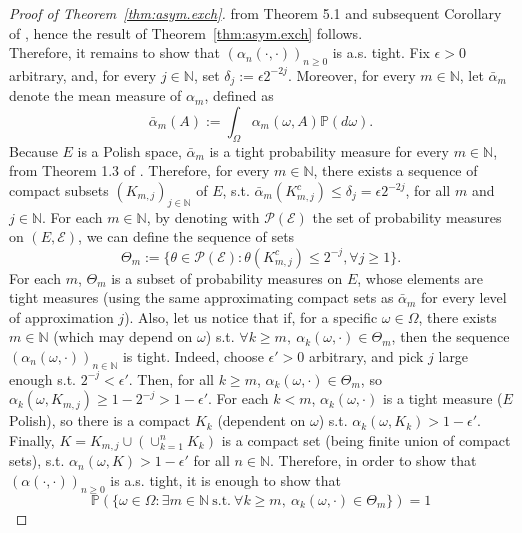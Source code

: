 \documentclass{article}
\theoremstyle{definition}
\renewcommand{\&}{and}
\begin{document}
\begin{proof}[Proof of Theorem~\ref{thm:asym.exch}]
from Theorem 5.1 and subsequent Corollary of \cite{bil99}, hence the result of Theorem~\ref{thm:asym.exch} follows. \vspace{0.2cm} \\
Therefore, it remains to show that $(\alpha_n(\cdot,\cdot))_{n\geq 0}$ is a.s. tight.    
Fix $\epsilon>0$ arbitrary, and, for every $j\in \mathbb{N}$, set $\delta_{j} := \epsilon 2^{-2j}$. Moreover, for every $m\in \mathbb{N}$, let $\bar{\alpha}_{m}$ denote the mean measure of $\alpha_{m}$, defined as 
$$\bar{\alpha}_{m}(A):= \int_{\Omega} \alpha_{m}(\omega,A) \mathbb{P}(d\omega).$$ Because $E$ is a Polish space, $\bar{\alpha}_{m}$ is a tight probability measure for every $m\in \mathbb{N}$, from Theorem 1.3 of \cite{bil99}. Therefore, for every $m\in \mathbb{N}$, there exists a sequence of compact subsets $(K_{m,j})_{j\in \mathbb{N}}$ of $E$, s.t. $\bar{\alpha}_{m}(K_{m,j}^{c})\leq \delta_{j}=\epsilon 2^{-2j}$, for all $m$ and $j\in \mathbb{N}$.  For each $m\in \mathbb{N}$, by denoting with $\mathcal{P}(\mathcal{E})$ the set of probability measures on $(E,\mathcal{E})$, we can define the sequence of sets
\begin{equation*}
    \Theta_{m}:=\{ \theta \in \mathcal{P}(\mathcal{E}) : \theta(K^{c}_{m,j} )\leq 2^{-j}, \forall j \geq 1\}.
\end{equation*}
For each $m$, $\Theta_{m}$ is a subset of probability measures on $E$, whose elements are tight measures (using the same approximating compact sets as $\bar{\alpha}_{m}$ for every level of approximation $j$). Also, let us notice that if, for a specific $\omega \in \Omega$,  there exists $m \in \mathbb{N}$ (which may depend on $\omega$) s.t. $\forall k\geq m, \ \alpha_{k}(\omega, \cdot) \in \Theta_{m}$, then the sequence $(\alpha_{n}(\omega, \cdot))_{n\in \mathbb{N}}$ is tight. Indeed, choose $\epsilon'>0$ arbitrary, and pick $j$ large enough s.t. $2^{-j}<\epsilon'$. Then, for all $k\geq m$, $\alpha_{k}(\omega, \cdot) \in \Theta_{m}$, so   $\alpha_{k}(\omega, K_{m,j}) \geq  1- 2^{-j} > 1-\epsilon'$. For each $k<m$, $\alpha_{k}(\omega,\cdot)$ is a tight measure ($E$ Polish), so there is a compact $K_{k}$ (dependent on $\omega$) s.t. $\alpha_{k}(\omega,K_{k})>1-\epsilon'$. Finally, $K= K_{m,j} \cup (\cup_{k=1}^{n} K_{k})$ is a compact set (being finite union of compact sets), s.t. $\alpha_{n}(\omega,K)>1-\epsilon'$ for all $n\in \mathbb{N}$. Therefore, in order to show that $(\alpha(\cdot,\cdot))_{n\geq 0}$ is a.s. tight, it is enough to show that 
\begin{equation}\label{eq:proof.tight0}
    \mathbb{P}\left(\{\omega \in \Omega : \exists m \in \mathbb{N} \ \text{s.t.} \ \forall k\geq m, \ \alpha_{k}(\omega, \cdot) \in \Theta_{m} \} \right) = 1
\end{equation}


\end{proof}
\end{document}
